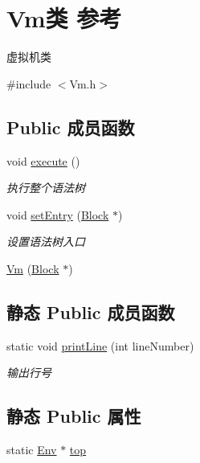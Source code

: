 \hypertarget{class_vm}{}\section{Vm类 参考}
\label{class_vm}


虚拟机类  




{\ttfamily \#include $<$Vm.\+h$>$}

\subsection*{Public 成员函数}
\begin{DoxyCompactItemize}
\item 
\mbox{\label{class_vm_a37a0791ef2b63e41421446993d0e7e4d}} 
void \hyperlink{class_vm_a37a0791ef2b63e41421446993d0e7e4d}{execute} ()
\begin{DoxyCompactList}\small\item\em 执行整个语法树 \end{DoxyCompactList}\item 
\mbox{\label{class_vm_af036edc52fab207ca28530c06b6d0c67}} 
void \hyperlink{class_vm_af036edc52fab207ca28530c06b6d0c67}{set\+Entry} (\hyperlink{class_block}{Block} $\ast$)
\begin{DoxyCompactList}\small\item\em 设置语法树入口 \end{DoxyCompactList}\item 
\hyperlink{class_vm_a4a37106b5b5b9382baa79dea901db8ba}{Vm} (\hyperlink{class_block}{Block} $\ast$)
\end{DoxyCompactItemize}
\subsection*{静态 Public 成员函数}
\begin{DoxyCompactItemize}
\item 
\mbox{\label{class_vm_a376141bb4182218ac7a499043eb18a6c}} 
static void \hyperlink{class_vm_a376141bb4182218ac7a499043eb18a6c}{print\+Line} (int line\+Number)
\begin{DoxyCompactList}\small\item\em 输出行号 \end{DoxyCompactList}\end{DoxyCompactItemize}
\subsection*{静态 Public 属性}
\begin{DoxyCompactItemize}
\item 
static \hyperlink{class_env}{Env} $\ast$ \hyperlink{class_vm_a1a83823801a5ab090d9ad20527a6c638}{top}
\end{DoxyCompactItemize}
